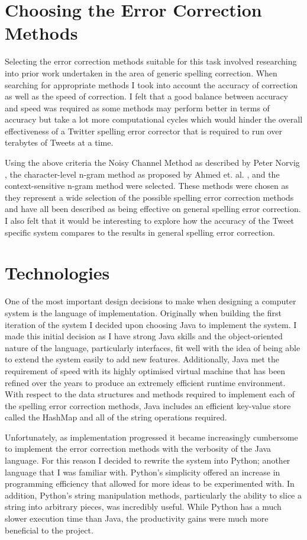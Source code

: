 \section{Choosing the Error Correction Methods}
Selecting the error correction methods suitable for this task involved researching into prior work undertaken in the area of generic spelling correction. When searching for appropriate methods I took into account the accuracy of correction as well as the speed of correction. I felt that a good balance between accuracy and speed was required as some methods may perform better in terms of accuracy but take a lot more computational cycles which would hinder the overall effectiveness of a Twitter spelling error corrector that is required to run over terabytes of Tweets at a time.

Using the above criteria the Noisy Channel Method as described by Peter Norvig \cite{}, the character-level n-gram method as proposed by Ahmed et. al. \cite{}, and the context-sensitive n-gram method were selected. These methods were chosen as they represent a wide selection of the possible spelling error correction methods and have all been described as being effective on general spelling error correction. I also felt that it would be interesting to explore how the accuracy of the Tweet specific system compares to the results in general spelling error correction.

\section{Technologies}
One of the most important design decisions to make when designing a computer system is the language of implementation. Originally when building the first iteration of the system I decided upon choosing Java to implement the system. I made this initial decision as I have strong Java skills and the object-oriented nature of the language, particularly interfaces, fit well with the idea of being able to extend the system easily to add new features. Additionally, Java met the requirement of speed with its highly optimised virtual machine that has been refined over the years to produce an extremely efficient runtime environment. With respect to the data structures and methods required to implement each of the spelling error correction methods, Java includes an efficient key-value store called the HashMap and all of the string operations required.

Unfortunately, as implementation progressed it became increasingly cumbersome to implement the error correction methods with the verbosity of the Java language. For this reason I decided to rewrite the system into Python; another language that I was familiar with. Python's simplicity offered an increase in programming efficiency that allowed for more ideas to be experimented with. In addition, Python's string manipulation methods, particularly the ability to slice a string into arbitrary pieces, was incredibly useful. While Python has a much slower execution time than Java, the productivity gains were much more beneficial to the project.

